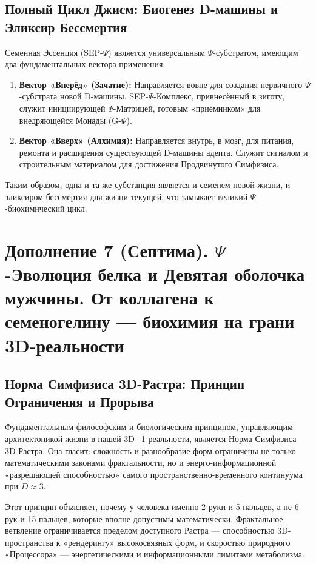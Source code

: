 \documentclass[a4paper,12pt]{article}
\begin{document}
\subsection{Полный Цикл Джисм: Биогенез D-машины и Эликсир Бессмертия}

Семенная Эссенция (SEP-$\Psi$) является универсальным $\Psi$-субстратом, имеющим два фундаментальных вектора применения:

\begin{enumerate}
	\item \textbf{Вектор «Вперёд» (Зачатие):} Направляется вовне для создания первичного $\Psi$-субстрата новой D-машины. SEP-$\Psi$-Комплекс, привнесённый в зиготу, служит инициирующей $\Psi$-Матрицей, готовым «приёмником» для внедряющейся Монады (G-$\Psi$).
	
	\item \textbf{Вектор «Вверх» (Алхимия):} Направляется внутрь, в мозг, для питания, ремонта и расширения существующей D-машины адепта. Служит сигналом и строительным материалом для достижения Продвинутого Симфизиса.
\end{enumerate}

Таким образом, одна и та же субстанция является и семенем новой жизни, и эликсиром бессмертия для жизни текущей, что замыкает великий $\Psi$-биохимический цикл.

\newpage
\section{Дополнение 7 (Септима). $\Psi$-Эволюция белка и Девятая оболочка мужчины. От коллагена к семеногелину — биохимия на грани 3D-реальности}

\subsection{Норма Симфизиса 3D-Растра: Принцип Ограничения и Прорыва}

Фундаментальным философским и биологическим принципом, управляющим архитектоникой жизни в нашей 3D+1 реальности, является Норма Симфизиса 3D-Растра. Она гласит: сложность и разнообразие форм ограничены не только математическими законами фрактальности, но и энерго-информационной «разрешающей способностью» самого пространственно-временного континуума при $D \approx 3$.

Этот принцип объясняет, почему у человека именно 2 руки и 5 пальцев, а не 6 рук и 15 пальцев, которые вполне допустимы математически. Фрактальное ветвление ограничивается пределом доступного Растра — способностью 3D-пространства к «рендерингу» высокосвязных форм, и скоростью природного «Процессора» — энергетическими и информационными лимитами метаболизма.
\end{document}
